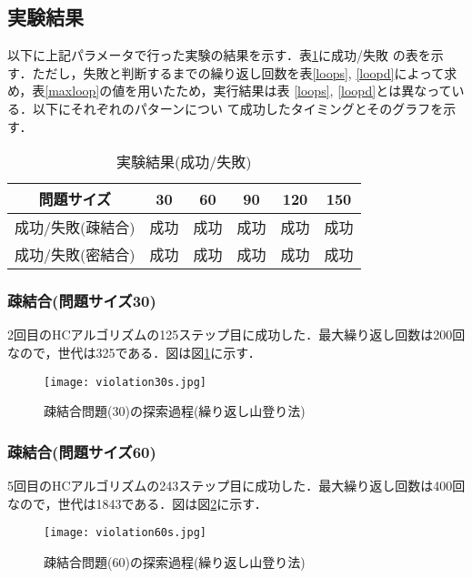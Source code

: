 \documentclass[a4j]{jarticle}
\begin{document}
\subsection*{実験結果}
以下に上記パラメータで行った実験の結果を示す．表\ref{result}に成功/失敗
の表を示す．ただし，失敗と判断するまでの繰り返し回数を表\ref{loops},
\ref{loopd}によって求め，表\ref{maxloop}の値を用いたため，実行結果は表
\ref{loops}, \ref{loopd}とは異なっている．以下にそれぞれのパターンについ
て成功したタイミングとそのグラフを示す．

\begin{table}[htb]
 \begin{center}
  \begin{tabular}[tb]{|c|c|c|c|c|c|} \hline
   問題サイズ & 30& 60& 90& 120& 150 \\ \hline
   成功/失敗(疎結合)& 成功& 成功& 成功& 成功& 成功 \\ \hline
   成功/失敗(密結合)& 成功& 成功& 成功& 成功& 成功 \\ \hline
  \end{tabular}
  \caption{実験結果(成功/失敗)}
  \label{result}
 \end{center}
\end{table}

\subsubsection*{疎結合(問題サイズ30)}
2回目のHCアルゴリズムの125ステップ目に成功した．最大繰り返し回数は200回
なので，世代は325である．図は図\ref{30s}に示す．
\begin{figure}[htb]
 \begin{center}
  \texttt{[image: violation30s.jpg]}
  \caption{疎結合問題(30)の探索過程(繰り返し山登り法)}
  \label{30s}
 \end{center}
\end{figure}

\subsubsection*{疎結合(問題サイズ60)}
5回目のHCアルゴリズムの243ステップ目に成功した．最大繰り返し回数は400回
なので，世代は1843である．図は図\ref{60s}に示す．
\begin{figure}[htb]
 \begin{center}
  \texttt{[image: violation60s.jpg]}
  \caption{疎結合問題(60)の探索過程(繰り返し山登り法)}
  \label{60s}
 \end{center}
\end{figure}
\end{document}
